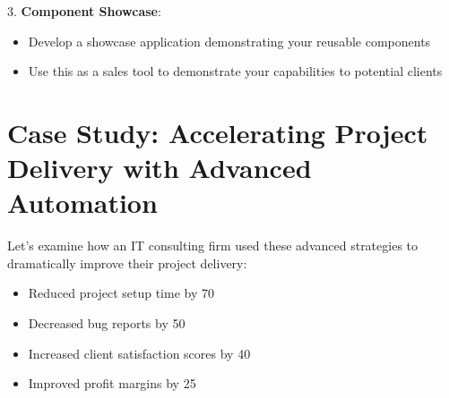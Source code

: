 3. \textbf{Component Showcase}:
\begin{itemize}
    \item Develop a showcase application demonstrating your reusable components
    \item Use this as a sales tool to demonstrate your capabilities to potential clients
\end{itemize}


\section{Case Study: Accelerating Project Delivery with Advanced Automation}

Let's examine how an IT consulting firm used these advanced strategies to dramatically improve their project delivery:

\begin{itemize}
    \item Reduced project setup time by 70%
    \item Decreased bug reports by 50%
    \item Increased client satisfaction scores by 40%
    \item Improved profit margins by 25%
\end{itemize}

